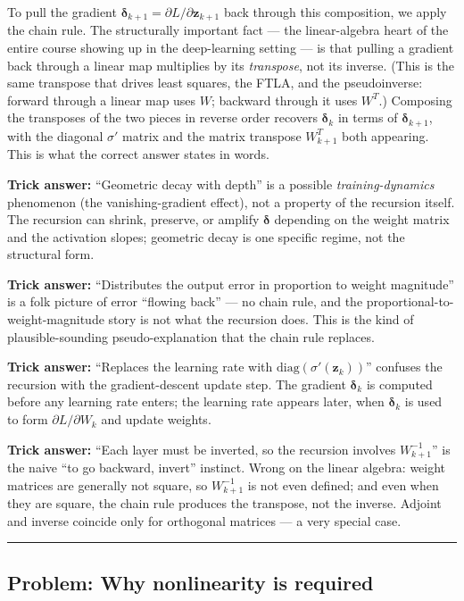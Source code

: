 \documentclass[12pt]{amsart}
\newcommand{\divider}{
  \vspace{-1em}
  \noindent
  \raisebox{-0.15ex}{\textbullet}%
  \hspace{0.5em}%
  \rule[0.5ex]{0.95\textwidth}{1.0pt}%
  \hspace{0.5em}%
  \raisebox{-0.15ex}{\textbullet}%
  \vspace{0em}
}
\begin{document}
To pull the gradient $\boldsymbol{\delta}_{k+1} = \partial L / \partial \mathbf{z}_{k+1}$
back through this composition, we apply the chain rule. The structurally
important fact --- the linear-algebra heart of the entire course showing up
in the deep-learning setting --- is that pulling a gradient back through a
linear map multiplies by its \emph{transpose}, not its inverse. (This is
the same transpose that drives least squares, the FTLA, and the
pseudoinverse: forward through a linear map uses $W$; backward through it
uses $W^T$.) Composing the transposes of the two pieces in reverse order
recovers $\boldsymbol{\delta}_k$ in terms of $\boldsymbol{\delta}_{k+1}$,
with the diagonal $\sigma'$ matrix and the matrix transpose $W_{k+1}^T$
both appearing. This is what the correct answer states in words.

\textbf{Trick answer:}
``Geometric decay with depth'' is a possible \emph{training-dynamics}
phenomenon (the vanishing-gradient effect), not a property of the
recursion itself. The recursion can shrink, preserve, or amplify
$\boldsymbol{\delta}$ depending on the weight matrix and the activation
slopes; geometric decay is one specific regime, not the structural form.

\textbf{Trick answer:}
``Distributes the output error in proportion to weight magnitude'' is a
folk picture of error ``flowing back'' --- no chain rule, and the
proportional-to-weight-magnitude story is not what the recursion does.
This is the kind of plausible-sounding pseudo-explanation that the chain
rule replaces.

\textbf{Trick answer:}
``Replaces the learning rate with $\mathrm{diag}(\sigma'(\mathbf{z}_k))$''
confuses the recursion with the gradient-descent update step. The gradient
$\boldsymbol{\delta}_k$ is computed before any learning rate enters; the
learning rate appears later, when $\boldsymbol{\delta}_k$ is used to form
$\partial L / \partial W_k$ and update weights.

\textbf{Trick answer:}
``Each layer must be inverted, so the recursion involves $W_{k+1}^{-1}$'' is
the naive ``to go backward, invert'' instinct. Wrong on the linear
algebra: weight matrices are generally not square, so $W_{k+1}^{-1}$ is
not even defined; and even when they are square, the chain rule produces
the transpose, not the inverse. Adjoint and inverse coincide only for
orthogonal matrices --- a very special case.

\divider

\subsection*{Problem: Why nonlinearity is required}
\end{document}
